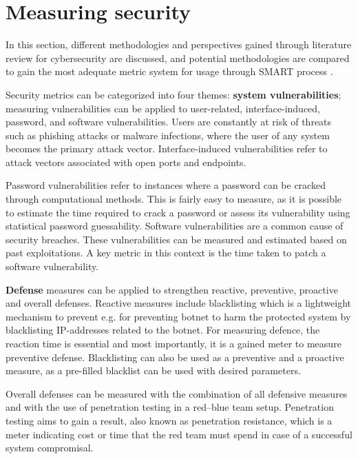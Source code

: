 \section{Measuring security} \label{measuringsecurity}

In this section, different methodologies and perspectives gained
through literature review for cybersecurity are discussed, and
potential methodologies are compared to gain the most adequate metric
system for usage through SMART process \cite{payne2006guide}.

Security metrics can be categorized into four themes:
\textbf{system vulnerabilities}; measuring vulnerabilities can be
applied to user-related, interface-induced, password, and software
vulnerabilities. Users are constantly at risk of threats such as
phishing attacks or malware infections, where the user of any system
becomes the primary attack vector. Interface-induced vulnerabilities refer to attack vectors associated with open ports
and endpoints. \cite{pendleton2016survey}

Password vulnerabilities refer to instances where a password can be
cracked through computational methods. This is fairly easy to measure,
as it is possible to estimate the time required to crack a password or
assess its vulnerability using statistical password
guessability. Software vulnerabilities are a common cause of security
breaches. These vulnerabilities can be measured and estimated based on
past exploitations. A key metric in this context is the time taken to
patch a software vulnerability. \cite{pendleton2016survey}

\textbf{Defense} measures can be applied to strengthen reactive,
preventive, proactive and overall defenses. Reactive measures include
blacklisting which is a lightweight mechanism to prevent e.g. for preventing botnet to harm
the protected system by blacklisting IP-addresses related to the
botnet. For measuring defence, the reaction time is essential and
most importantly, it is a gained meter to measure preventive
defense. Blacklisting can also be used as a preventive and a proactive
measure, as a pre-filled blacklist can be used with desired
parameters. \cite{pendleton2016survey, ramos2017model}

Overall defenses can be measured with the combination of all defensive
measures and with the use of penetration testing in a red–blue team
setup. Penetration testing aims to gain a result, also known as
penetration resistance, which is a meter indicating cost or time that
the red team must spend in case of a successful system
compromisal. \cite{pendleton2016survey, ramos2017model}

